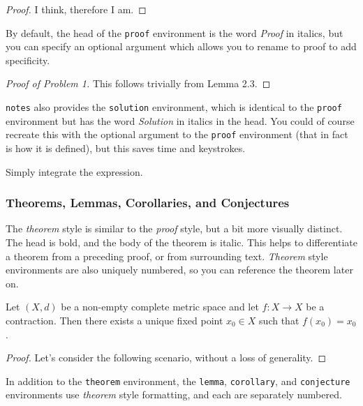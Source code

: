 \documentclass[diagram]{notes}
\begin{document}
\begin{proof}
I think, therefore I am.
\end{proof}

By default, the head of the \texttt{proof} environment is the word \emph{Proof} in italics, but you can specify an optional argument which allows you to rename to proof to add specificity.

\begin{proof}[Proof of Problem 1]
This follows trivially from Lemma 2.3.
\end{proof}

\texttt{notes} also provides the \texttt{solution} environment, which is identical to the \texttt{proof} environment but has the word \emph{Solution} in italics in the head. You could of course recreate this with the optional argument to the \texttt{proof} environment (that in fact is how it is defined), but this saves time and keystrokes.

\begin{solution}
Simply integrate the expression.
\end{solution}

\subsubsection{Theorems, Lemmas, Corollaries, and Conjectures}

The \emph{theorem} style is similar to the \emph{proof} style, but a bit more visually distinct. The head is bold, and the body of the theorem is italic. This helps to differentiate a theorem from a preceding proof, or from surrounding text. \emph{Theorem} style environments are also uniquely numbered, so you can reference the theorem later on.

\begin{theorem}\label{thm:banach}
Let $(X,d)$ be a non-empty complete metric space and let $f : X \to X$ be a contraction. Then there exists a unique fixed point $x_0 \in X$ such that $f(x_0) = x_0$.
\end{theorem}

\begin{proof}
Let's consider the following scenario, without a loss of generality.
\end{proof}

In addition to the \texttt{theorem} environment, the \texttt{lemma}, \texttt{corollary}, and \texttt{conjecture} environments use \emph{theorem} style formatting, and each are separately numbered.
\end{document}
